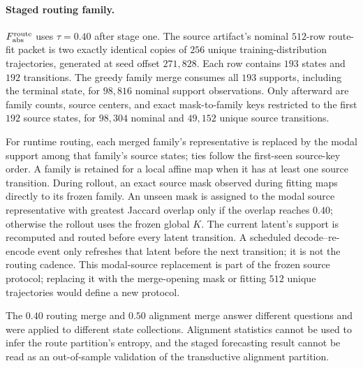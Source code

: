 \paragraph{Staged routing family.}
\(F_{\rm abs}^{\rm route}\) uses \(\tau=0.40\) after stage one. The source artifact's nominal \(512\)-row route-fit packet is two exactly identical copies of \(256\) unique training-distribution trajectories, generated at seed offset \(271{,}828\). Each row contains \(193\) states and \(192\) transitions. The greedy family merge consumes all \(193\) supports, including the terminal state, for \(98{,}816\) nominal support observations. Only afterward are family counts, source centers, and exact mask-to-family keys restricted to the first \(192\) source states, for \(98{,}304\) nominal and \(49{,}152\) unique source transitions.

For runtime routing, each merged family's representative is replaced by the modal support among that family's source states; ties follow the first-seen source-key order. A family is retained for a local affine map when it has at least one source transition. During rollout, an exact source mask observed during fitting maps directly to its frozen family. An unseen mask is assigned to the modal source representative with greatest Jaccard overlap only if the overlap reaches \(0.40\); otherwise the rollout uses the frozen global \(K\). The current latent's support is recomputed and routed before every latent transition. A scheduled decode--re-encode event only refreshes that latent before the next transition; it is not the routing cadence. This modal-source replacement is part of the frozen source protocol; replacing it with the merge-opening mask or fitting \(512\) unique trajectories would define a new protocol.

The \(0.40\) routing merge and \(0.50\) alignment merge answer different questions and were applied to different state collections. Alignment statistics cannot be used to infer the route partition's entropy, and the staged forecasting result cannot be read as an out-of-sample validation of the transductive alignment partition.
